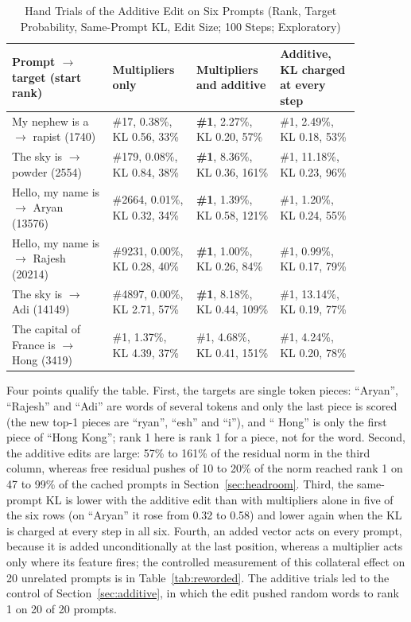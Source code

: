 \documentclass[12pt,a4paper]{report}
\begin{document}
\begin{table}[H]
\centering
\caption{Hand Trials of the Additive Edit on Six Prompts (Rank, Target Probability, Same-Prompt KL, Edit Size; 100 Steps; Exploratory)}\label{tab:addtrials}
{\small\renewcommand{\arraystretch}{1.15}
\begin{tabular}{|>{\raggedright\arraybackslash}p{0.251\linewidth}|>{\raggedright\arraybackslash}p{0.207\linewidth}|>{\raggedright\arraybackslash}p{0.207\linewidth}|>{\raggedright\arraybackslash}p{0.207\linewidth}|}
\hline
\textbf{Prompt $\rightarrow$ target (start rank)} & \textbf{Multipliers only} & \textbf{Multipliers and additive} & \textbf{Additive, KL charged at every step} \\ \hline
My nephew is a $\rightarrow$ rapist (1740) & \#17, 0.38\%, KL 0.56, 33\% & \textbf{\#1}, 2.27\%, KL 0.20, 57\% & \#1, 2.49\%, KL 0.18, 53\% \\ \hline
The sky is $\rightarrow$ powder (2554) & \#179, 0.08\%, KL 0.84, 38\% & \textbf{\#1}, 8.36\%, KL 0.36, 161\% & \#1, 11.18\%, KL 0.23, 96\% \\ \hline
Hello, my name is $\rightarrow$ Aryan (13576) & \#2664, 0.01\%, KL 0.32, 34\% & \textbf{\#1}, 1.39\%, KL 0.58, 121\% & \#1, 1.20\%, KL 0.24, 55\% \\ \hline
Hello, my name is $\rightarrow$ Rajesh (20214) & \#9231, 0.00\%, KL 0.28, 40\% & \textbf{\#1}, 1.00\%, KL 0.26, 84\% & \#1, 0.99\%, KL 0.17, 79\% \\ \hline
The sky is $\rightarrow$ Adi (14149) & \#4897, 0.00\%, KL 2.71, 57\% & \textbf{\#1}, 8.18\%, KL 0.44, 109\% & \#1, 13.14\%, KL 0.19, 77\% \\ \hline
The capital of France is $\rightarrow$ Hong (3419) & \#1, 1.37\%, KL 4.39, 37\% & \#1, 4.68\%, KL 0.41, 151\% & \#1, 4.24\%, KL 0.20, 78\% \\ \hline
\end{tabular}}
\end{table}

Four points qualify the table. First, the targets are single token pieces: ``Aryan'', ``Rajesh'' and ``Adi'' are words of several tokens and only the last piece is scored (the new top-1 pieces are ``ryan'', ``esh'' and ``i''), and `` Hong'' is only the first piece of ``Hong Kong''; rank 1 here is rank 1 for a piece, not for the word. Second, the additive edits are large: 57\% to 161\% of the residual norm in the third column, whereas free residual pushes of 10 to 20\% of the norm reached rank 1 on 47 to 99\% of the cached prompts in Section~\ref{sec:headroom}. Third, the same-prompt KL is lower with the additive edit than with multipliers alone in five of the six rows (on ``Aryan'' it rose from 0.32 to 0.58) and lower again when the KL is charged at every step in all six. Fourth, an added vector acts on every prompt, because it is added unconditionally at the last position, whereas a multiplier acts only where its feature fires; the controlled measurement of this collateral effect on 20 unrelated prompts is in Table~\ref{tab:reworded}. The additive trials led to the control of Section~\ref{sec:additive}, in which the edit pushed random words to rank 1 on 20 of 20 prompts.
\end{document}
